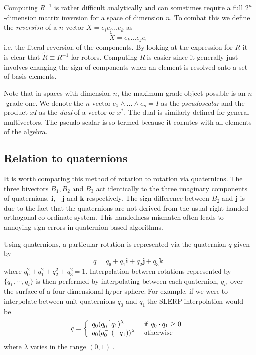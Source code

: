 Computing $R^{-1}$ is rather difficult analytically and can sometimes
require a full $2^n$-dimension matrix inversion for a space of
dimension $n$. To combat this we define
the \emph{reversion} of a $n$-vector $X = e_ie_j...e_k$ as
\[
\tilde{X} = e_k...e_je_i
\]
i.e. the literal reversion of the components. By looking at the expression for
$R$ it is clear that $\tilde{R} \equiv R^{-1}$ for rotors. Computing
$\tilde{R}$ is easier since it generally just involves changing the sign of
components when an element is resolved onto a set of basis elements.

Note that in spaces with dimension $n$, the maximum grade object possible is
an $n$-grade one. We denote the $n$-vector $e_1 \wedge ... \wedge e_n = I$ as
the \emph{pseudoscalar} and the product $xI$ as the \emph{dual} of a vector or
$x^*$. The dual is similarly defined for general multivectors. The
pseudo-scalar is so termed because it comutes with all elements of the
algebra.

\subsection{Relation to quaternions}
\label{sec:quaternions}

It is worth comparing this method of rotation to rotation via
quaternions. The three bivectors $B_1,B_2$ and $B_3$ act identically to the
three imaginary components of quaternions, $\mathbf{i}, -\mathbf{j}$ and
$\mathbf{k}$ respectively. The sign difference between $B_2$ and $\mathbf{j}$
is due to the fact that the quaternions are not derived from the usual
right-handed orthogonal co-ordinate system. This handedness mismatch often
leads to annoying sign errors in quaternion-based algorithms.

Using quaternions, a particular rotation is represented via the quaternion 
$q$ given by
\[
q = q_0 + q_1 \mathbf{i} + q_2 \mathbf{j} + q_3 \mathbf{k}
\]
where $q_0^2 + q_1^2 + q_2^2 + q_3^2 = 1$. Interpolation between rotations 
represented
by $\{ q_1, \cdots, q_i \}$ is then performed by interpolating between
each quaternion, $q_i$,
over the surface of a four-dimensional hyper-sphere. For example, if we 
were to interpolate
between unit quaternions $q_0$ and $q_1$ the SLERP interpolation would be
\[
q = \left\{
\begin{array}{ll}
q_0(q_0^{-1}q_1)^\lambda & {\rm ~if~} q_0 \cdot q_1 \ge 0 \\
q_0(q_0^{-1}(-q_1))^\lambda & {\rm ~otherwise}
\end{array}
\right.
\]
where $\lambda$ varies in the range $(0,1)$ \cite{slerp}.

